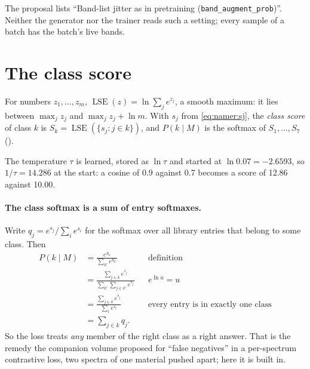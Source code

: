 \begin{sourcenote}
The proposal lists ``Band-list jitter as in pretraining (\texttt{band\_augment\_prob})''. Neither the generator nor the
trainer reads such a setting; every sample of a batch has the batch's live bands.
\end{sourcenote}

\section{The class score}\label{sec:namer:classscore}

\begin{definition}
For numbers $z_1,\dots,z_m$, $\operatorname{LSE}(z)=\ln\sum_j e^{z_j}$, a smooth maximum: it lies
between $\max_j z_j$ and $\max_j z_j+\ln m$. With $s_j$ from \cref{eq:namer:sj}, the \emph{class score} of class $k$ is
$S_k=\operatorname{LSE}(\{s_j: j\in k\})$, and $P(k\mid M)$ is the softmax of $S_1,\dots,S_7$ ().
\end{definition}

The temperature $\tau$ is learned, stored as $\ln\tau$ and started at $\ln0.07=-2.6593$, so
$1/\tau=14.286$ at the start: a cosine of 0.9 against 0.7 becomes a score of 12.86 against 10.00.

\paragraph{The class softmax is a sum of entry softmaxes.} Write $q_j=e^{s_j}/\sum_i e^{s_i}$ for the softmax over all
library entries that belong to some class. Then
\begin{align*}
P(k\mid M) &= \frac{e^{S_k}}{\sum_{k'}e^{S_{k'}}} &&\text{definition}\\
&= \frac{\sum_{j\in k}e^{s_j}}{\sum_{k'}\sum_{j\in k'}e^{s_j}} &&e^{\ln u}=u\\
&= \frac{\sum_{j\in k}e^{s_j}}{\sum_i e^{s_i}} &&\text{every entry is in exactly one class}\\
&= \sum_{j\in k}q_j .
\end{align*}
So the loss treats \emph{any} member of the right class as a right answer. That is the remedy the companion volume
proposed for ``false negatives'' in a per-spectrum contrastive loss, two spectra of one material pushed apart; here it
is built in.

